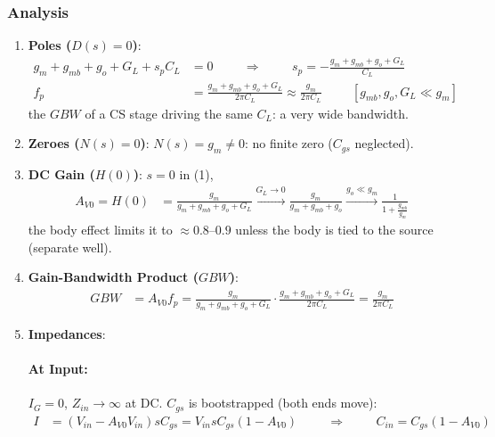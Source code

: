 \subsubsection{Analysis}
\begin{enumerate}
  \item \textbf{Poles (\(D(s) = 0\))}:
    \begin{align*}
      g_m + g_{mb} + g_o + G_L + s_p C_L &= 0 \hspace{1cm} \Rightarrow \hspace{1cm} s_p = -\frac{g_m + g_{mb} + g_o + G_L}{C_L} \\
      f_p &= \frac{g_m + g_{mb} + g_o + G_L}{2\pi C_L} \approx \frac{g_m}{2\pi C_L} \hspace{1cm} [g_{mb}, g_o, G_L \ll g_m]
    \end{align*}
    the \(GBW\) of a CS stage driving the same \(C_L\): a very wide bandwidth.
  \item \textbf{Zeroes (\(N(s) = 0\))}: \(N(s) = g_m \neq 0\): no finite zero (\(C_{gs}\) neglected).
  \item \textbf{DC Gain (\(H(0)\))}: \(s = 0\) in (1),
    \begin{align*}
      A_{V0} = H(0) &= \frac{g_m}{g_m + g_{mb} + g_o + G_L} \xrightarrow{G_L \to 0} \frac{g_m}{g_m + g_{mb} + g_o} \xrightarrow{g_o \ll g_m} \frac{1}{1 + \frac{g_{mb}}{g_m}}
    \end{align*}
    the body effect limits it to \(\approx 0.8\text{--}0.9\) unless the body is tied to the
    source (separate well).
  \item \textbf{Gain-Bandwidth Product (\(GBW\))}:
    \begin{align*}
      GBW &= A_{V0} f_p = \frac{g_m}{g_m + g_{mb} + g_o + G_L}\cdot\frac{g_m + g_{mb} + g_o + G_L}{2\pi C_L} = \frac{g_m}{2\pi C_L}
    \end{align*}
  \item \textbf{Impedances}:
    \paragraph{At Input:} \(I_G = 0\), \(Z_{in} \to \infty\) at DC. \(C_{gs}\) is bootstrapped
    (both ends move):
    \begin{align*}
      I &= (V_{in} - A_{V0} V_{in}) sC_{gs} = V_{in} sC_{gs}(1 - A_{V0}) \hspace{1cm} \Rightarrow \hspace{1cm} C_{in} = C_{gs}(1 - A_{V0})
    \end{align*}

\end{enumerate}
